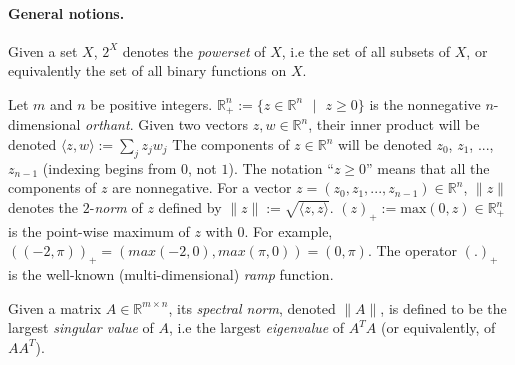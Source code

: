 \documentclass{article} %
\begin{document}
\paragraph{\textbf{General notions.}}
Given a set $X$, $2^X$ denotes the \emph{powerset} of $X$, i.e the set
of all subsets of $X$, or equivalently the set of all binary
functions on $X$.

Let $m$ and $n$ be positive integers.
$\mathbb{R}^{n}_+ := \{z \in \mathbb{R}^{n}\text{ }|\text{ } z \geq
0\}$ is the nonnegative $n$-dimensional \textit{orthant}.  Given two
vectors $z, w \in \mathbb{R}^n$, their inner product will be denoted
$\langle z, w\rangle := \sum_{j}z_jw_j$ The components of $z \in \mathbb{R}^n$ will be
denoted $z_0$, $z_1$, ..., $z_{n-1}$ (indexing begins from $0$,
not $1$). The notation ``$z \ge 0$'' means that all the components of $z$ are
nonnegative. For a vector $z = (z_0, z_1, ..., z_{n-1}) \in
\mathbb{R}^n$, $\|z\|$ denotes the $2$-\textit{norm} of $z$ defined
by $\|z\| := \sqrt{\langle z, z\rangle}$.
$(z)_+:=\text{max}(0, z) \in \mathbb{R}^{n}_+$ is the point-wise
maximum of $z$ with $0$. For example, $((-2, \pi))_+ = (max(-2, 0),
max(\pi, 0)) = (0, \pi)$.
The operator $(.)_+$ is the well-known
(multi-dimensional) \textit{ramp} function.

Given a matrix $A \in \mathbb{R}^{m \times n}$, its \textit{spectral
  norm}, denoted $\|A\|$, is
 defined to be the largest \textit{singular value} of $A$, i.e the
 largest \textit{eigenvalue} of $A^TA$ (or equivalently, of $AA^T$).
\end{document}
